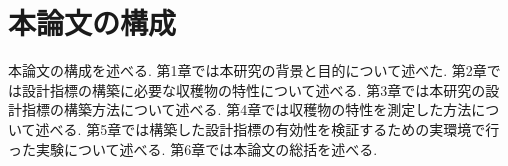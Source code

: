 \section{本論文の構成}
本論文の構成を述べる.
第1章では本研究の背景と目的について述べた.
第2章では設計指標の構築に必要な収穫物の特性について述べる.
第3章では本研究の設計指標の構築方法について述べる.
第4章では収穫物の特性を測定した方法について述べる.
第5章では構築した設計指標の有効性を検証するための実環境で行った実験について述べる.
第6章では本論文の総括を述べる.